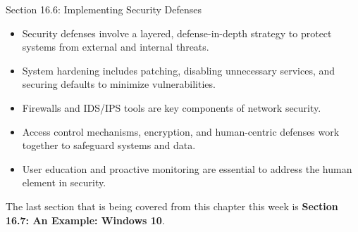 \begin{notes}{Section 16.6: Implementing Security Defenses}
    \begin{highlight}
        \begin{itemize}
            \item Security defenses involve a layered, defense-in-depth strategy to protect systems from external and internal threats.
            \item System hardening includes patching, disabling unnecessary services, and securing defaults to minimize vulnerabilities.
            \item Firewalls and IDS/IPS tools are key components of network security.
            \item Access control mechanisms, encryption, and human-centric defenses work together to safeguard systems and data.
            \item User education and proactive monitoring are essential to address the human element in security.
        \end{itemize}
    \end{highlight}
\end{notes}

The last section that is being covered from this chapter this week is \textbf{Section 16.7: An Example: Windows 10}.

